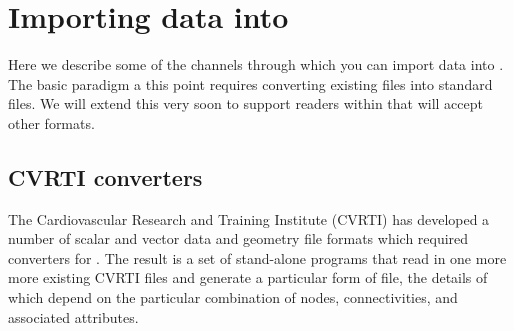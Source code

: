 %
%
\section{Importing data into \sr{}}
\label{sec:import} 

Here we describe some of the channels through which you can import data
into \sr{}.  The basic paradigm a this point requires converting existing
files into standard \sr{} files.  We will extend this very soon to support
readers within \sr{} that will accept other formats.


\subsection{CVRTI converters}

The Cardiovascular Research and Training Institute (CVRTI) has developed a
number of scalar and vector data and geometry file formats which required
converters for \sr{}.  The result is a set of stand-alone programs that read
in one more more existing CVRTI files and generate a particular form of
\sr{} file, the details of which depend on the particular combination of
nodes, connectivities, and associated attributes.

